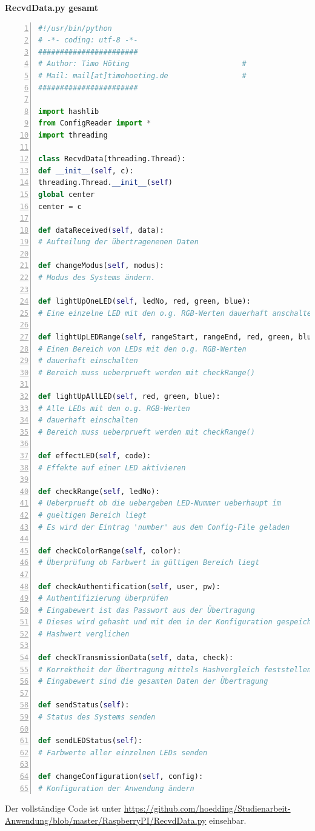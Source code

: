 \textbf{RecvdData.py gesamt} 
\begin{lstlisting}[caption =Implementierung des Nachrichten-Verarbeitung in Python, language=python, frame=single, breaklines=true,columns=fullflexible, commentstyle=\color{gray}\upshape, captionpos=b, numbers = left]
#!/usr/bin/python
# -*- coding: utf-8 -*-
#######################
# Author: Timo Höting                          #
# Mail: mail[at]timohoeting.de                 #
#######################

import hashlib
from ConfigReader import *
import threading

class RecvdData(threading.Thread):
def __init__(self, c):
threading.Thread.__init__(self)
global center
center = c

def dataReceived(self, data):
# Aufteilung der übertragenenen Daten

def changeModus(self, modus):
# Modus des Systems ändern.

def lightUpOneLED(self, ledNo, red, green, blue):
# Eine einzelne LED mit den o.g. RGB-Werten dauerhaft anschalten

def lightUpLEDRange(self, rangeStart, rangeEnd, red, green, blue):
# Einen Bereich von LEDs mit den o.g. RGB-Werten
# dauerhaft einschalten
# Bereich muss ueberprueft werden mit checkRange()

def lightUpAllLED(self, red, green, blue):
# Alle LEDs mit den o.g. RGB-Werten
# dauerhaft einschalten
# Bereich muss ueberprueft werden mit checkRange()

def effectLED(self, code):
# Effekte auf einer LED aktivieren

def checkRange(self, ledNo):
# Ueberprueft ob die uebergeben LED-Nummer ueberhaupt im
# gueltigen Bereich liegt
# Es wird der Eintrag 'number' aus dem Config-File geladen

def checkColorRange(self, color):
# Überprüfung ob Farbwert im gültigen Bereich liegt

def checkAuthentification(self, user, pw):
# Authentifizierung überprüfen
# Eingabewert ist das Passwort aus der Übertragung
# Dieses wird gehasht und mit dem in der Konfiguration gespeicherten
# Hashwert verglichen

def checkTransmissionData(self, data, check):
# Korrektheit der Übertragung mittels Hashvergleich feststellen
# Eingabewert sind die gesamten Daten der Übertragung

def sendStatus(self):
# Status des Systems senden

def sendLEDStatus(self):
# Farbwerte aller einzelnen LEDs senden

def changeConfiguration(self, config):
# Konfiguration der Anwendung ändern
\end{lstlisting}
Der vollständige Code ist unter \url{https://github.com/hoedding/Studienarbeit-Anwendung/blob/master/RaspberryPI/RecvdData.py} einsehbar.



